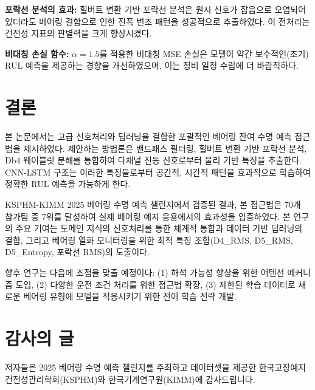 \documentclass[conference,twocolumn]{IEEEtran}
\begin{document}
\textbf{포락선 분석의 효과:} 힐버트 변환 기반 포락선 분석은 원시 신호가 잡음으로 오염되어 있더라도 베어링 결함으로 인한 진폭 변조 패턴을 성공적으로 추출하였다. 이 전처리는 건전성 지표의 판별력을 크게 향상시켰다.

\textbf{비대칭 손실 함수:} $\alpha = 1.5$를 적용한 비대칭 MSE 손실은 모델이 약간 보수적인(조기) RUL 예측을 제공하는 경향을 개선하였으며, 이는 정비 일정 수립에 더 바람직하다.

\section{결론}

본 논문에서는 고급 신호처리와 딥러닝을 결합한 포괄적인 베어링 잔여 수명 예측 접근법을 제시하였다. 제안하는 방법론은 밴드패스 필터링, 힐버트 변환 기반 포락선 분석, Db4 웨이블릿 분해를 통합하여 다채널 진동 신호로부터 물리 기반 특징을 추출한다. CNN-LSTM 구조는 이러한 특징들로부터 공간적, 시간적 패턴을 효과적으로 학습하여 정확한 RUL 예측을 가능하게 한다.

KSPHM-KIMM 2025 베어링 수명 예측 챌린지에서 검증된 결과, 본 접근법은 70개 참가팀 중 7위를 달성하여 실제 베어링 예지 응용에서의 효과성을 입증하였다. 본 연구의 주요 기여는 도메인 지식의 신호처리를 통한 체계적 통합과 데이터 기반 딥러닝의 결합, 그리고 베어링 열화 모니터링을 위한 최적 특징 조합(D4\_RMS, D5\_RMS, D5\_Entropy, 포락선 RMS)의 도출이다.

향후 연구는 다음에 초점을 맞출 예정이다: (1) 해석 가능성 향상을 위한 어텐션 메커니즘 도입, (2) 다양한 운전 조건 처리를 위한 접근법 확장, (3) 제한된 학습 데이터로 새로운 베어링 유형에 모델을 적응시키기 위한 전이 학습 전략 개발.

\section*{감사의 글}

저자들은 2025 베어링 수명 예측 챌린지를 주최하고 데이터셋을 제공한 한국고장예지건전성관리학회(KSPHM)와 한국기계연구원(KIMM)에 감사드립니다.



\end{document}
